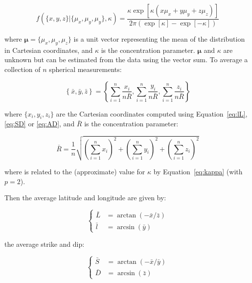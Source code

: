 \begin{equation}
  f(\{x,y,z\}|\{\mu_x,\mu_y,\mu_y\},\kappa) = \frac{\kappa\exp[\kappa
      (x\mu_x+y\mu_y+z\mu_z)]}{2\pi(\exp[\kappa]-\exp[-\kappa])}
  \label{eq:vonMisesFisher}
\end{equation}

\noindent where $\mathbf{\mu}=\{\mu_x,\mu_y,\mu_z\}$ is a unit vector
representing the mean of the distribution in Cartesian coordinates,
and $\kappa$ is the concentration parameter. $\mathbf{\mu}$ and
$\kappa$ are unknown but can be estimated from the data using the
vector sum. To average a collection of $n$ spherical measurements:

\begin{equation}
  \left\{\bar{x},\bar{y},\bar{z}\right\} =
  \left\{\sum_{i=1}^{n}\frac{x_i}{n\bar{R}},
  \sum_{i=1}^{n}\frac{y_i}{n\bar{R}},
  \sum_{i=1}^{n}\frac{z_i}{n\bar{R}}
  \right\}
\end{equation}

\noindent where $\{x_i,y_i,z_i\}$ are the Cartesian coordinates
computed using Equation~\ref{eq:lL}, \ref{eq:SD} or \ref{eq:AD},
and $\bar{R}$ is the concentration parameter:

\begin{equation}
  \bar{R} = \frac{1}{n}
    \sqrt{\left(\sum_{i=1}^{n}x_i\right)^2 +
      \left(\sum_{i=1}^{n}y_i\right)^2 +
      \left(\sum_{i=1}^{n}z_i\right)^2
    }
\end{equation}

\noindent where is related to the (approximate) value for $\kappa$ by
Equation~\ref{eq:kappa} (with $p=2$).

Then the average latitude and longitude are given by:

\begin{equation}
  \left\{
  \begin{split}
  \bar{L} & = \arctan\left(-\bar{x}/\bar{z}\right)\\
  \bar{l} & = \arcsin\left(\bar{y}\right)
  \end{split}
  \right.
\end{equation}

\noindent the average strike and dip:

\begin{equation}
  \left\{
  \begin{split}
    \bar{S} & = \arctan\left(-\bar{x}/\bar{y}\right)\\
    \bar{D} & = \arcsin\left(\bar{z}\right)
  \end{split}
  \right.
\end{equation}

